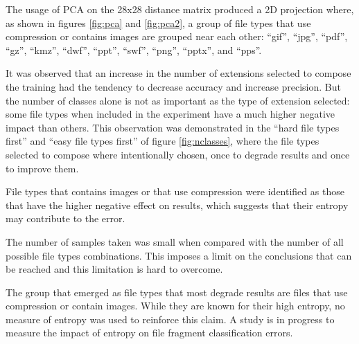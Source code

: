 
The usage of PCA on the 28x28 distance matrix produced a 2D projection where, as shown in figures \ref{fig:pca} and \ref{fig:pca2}, a group of file types that use compression or contains images are grouped near each other: 
``gif'',
``jpg'',
``pdf'',
``gz'',
``kmz'',
``dwf'',
``ppt'',
``swf'',
``png'',
``pptx'',
and ``pps''.

It was observed that an increase in the number of extensions selected to compose the training had the tendency to decrease accuracy and increase precision. But the number of classes alone is not as important as the type of extension selected: some file types when included in the experiment have a much higher negative impact than others. This observation was demonstrated in the ``hard file types first'' and ``easy file types first'' of figure \ref{fig:nclasses}, where the file types selected to compose  where intentionally chosen, once to degrade results and once to improve them.

File types that contains images or that use compression were identified as those that have the higher negative effect on results, which suggests that their entropy may contribute to the error.


The number of samples taken was small when compared with the number of all possible file types combinations. This imposes a limit on the conclusions that can be reached and this limitation is hard to overcome.

The group that emerged as file types that most degrade results are files that use compression or contain images. While they are known for their high entropy, no measure of entropy was used to reinforce this claim. A study is in progress to measure the impact of entropy on file fragment classification errors.